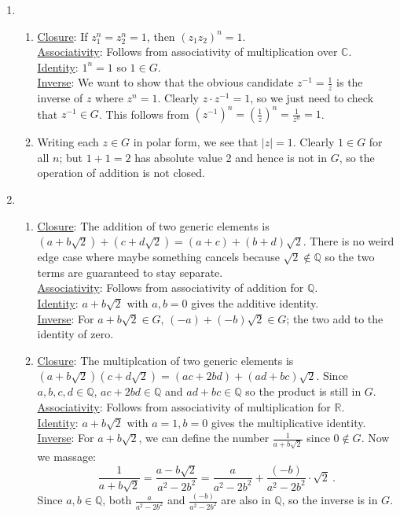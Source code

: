\documentclass[]{article}
\newcommand{\abs}[1]{\left\vert #1 \right\vert}
\newcommand{\bbq}{\mathbb{Q}}
\newcommand{\bbr}{\mathbb{R}}
\newcommand{\bbc}{\mathbb{C}}
\begin{document}
\begin{enumerate}
\item \begin{enumerate}
\item \underline{Closure}: If $z_1^n = z_2^n = 1$, then $(z_1 z_2)^n = 1$. \\
\underline{Associativity}: Follows from associativity of multiplication over $\bbc$. \\ 
\underline{Identity}: $1^n = 1$ so $1 \in G$. \\
\underline{Inverse}: We want to show that the obvious candidate $z^{-1} = \frac{1}{z}$ is the inverse of $z$ where $z^n = 1$. Clearly $z \cdot z^{-1} = 1$, so we just need to check that $z^{-1} \in G$. This follows from $\left(z^{-1}\right)^ n = \left(\frac{1}{z}\right)^n = \frac{1}{z^n} = 1$.
\item Writing each $z \in G$ in polar form, we see that $\abs{z} = 1$. Clearly $1 \in G$ for all $n$; but $1+1 = 2$ has absolute value 2 and hence is not in $G$, so the operation of addition is not closed.
\end{enumerate}


\item \begin{enumerate}
\item \underline{Closure}: The addition of two generic elements is $(a + b\sqrt{2}) + (c + d\sqrt{2}) = (a+c) + (b+d)\sqrt{2}$. There is no weird edge case where maybe something cancels because $\sqrt{2} \notin \bbq$ so the two terms are guaranteed to stay separate. \\
\underline{Associativity}: Follows from associativity of addition for $\bbq$. \\
\underline{Identity}: $a + b\sqrt{2}$ with $a,b=0$ gives the additive identity. \\
\underline{Inverse}: For $a+b\sqrt{2} \in G$, $(-a) + (-b)\sqrt{2} \in G$; the two add to the identity of zero.
\item \underline{Closure}: The multiplcation of two generic elements is $(a + b\sqrt{2})(c + d\sqrt{2}) = (ac+2bd) + (ad+bc)\sqrt{2}$. Since $a,b,c,d\in\bbq$, $ac+2bd\in\bbq$ and $ad+bc\in\bbq$ so the product is still in $G$.\\
\underline{Associativity}: Follows from associativity of multiplication for $\bbr$. \\
\underline{Identity}: $a + b\sqrt{2}$ with $a=1,b=0$ gives the multiplicative identity. \\
\underline{Inverse}: For $a+b\sqrt{2}$, we can define the number $\frac{1}{a+b\sqrt{2}}$ since $0 \notin G$. Now we massage:
\begin{equation}
\frac{1}{a+b\sqrt{2}} = \frac{a- b\sqrt{2}}{a^2-2b^2} = \frac{a}{a^2-2b^2} + \frac{(-b)}{a^2-2b^2}\cdot\sqrt{2}\ .
\end{equation}
Since $a,b\in\bbq$, both $\frac{a}{a^2-2b^2}$ and $\frac{(-b)}{a^2-2b^2}$ are also in $\bbq$, so the inverse is in $G$.
\end{enumerate}



\end{enumerate}
\end{document}
